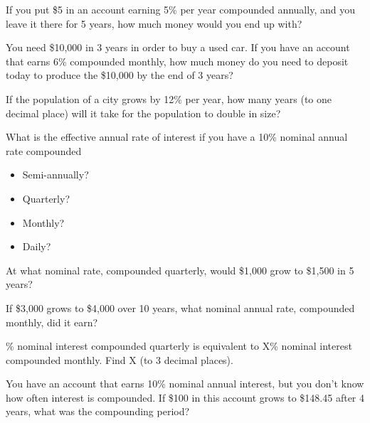 \documentclass[12pt]{exam}
\begin{document}
\begin{questions}

    \question If you put \$5 in an account earning 5\% per year compounded annually, and you leave it
    there for 5 years, how much money would you end up with?
    \vspace{1.5in}

    \question You need \$10,000 in 3 years in order to buy a used car. If you have an account
    that earns 6\% compounded monthly, how much money do you need to deposit today to
    produce the \$10,000 by the end of 3 years?
    \vspace{1.5in}

    \question If the population of a city grows by 12\% per year, how many years (to one decimal place) will it take for
    the population to double in size?
    \vspace{1.5in}

    \question What is the effective annual rate of interest if you have a 10\% nominal annual
    rate compounded
    \begin{itemize}
        \item Semi-annually?
        \item Quarterly?
        \item Monthly?
        \item Daily?
    \end{itemize}
    \vspace{2in}

    \question At what nominal rate, compounded quarterly, would \$1,000 grow to \$1,500 in 5 years?
    \vspace{2in}

    \question If \$3,000 grows to \$4,000 over 10 years, what nominal annual rate, compounded
    monthly, did it earn?
    \vspace{2in}

    \% nominal interest compounded quarterly is equivalent to X\% nominal interest
    compounded monthly. Find X (to 3 decimal places).
    \vspace{2in}

    \question You have an account that earns 10\% nominal annual interest, but you don’t know how
    often interest is compounded. If \$100 in this account grows to \$148.45 after 4 years, what
    was the compounding period?
    \vspace{1.5in}

\end{questions}
\end{document}
